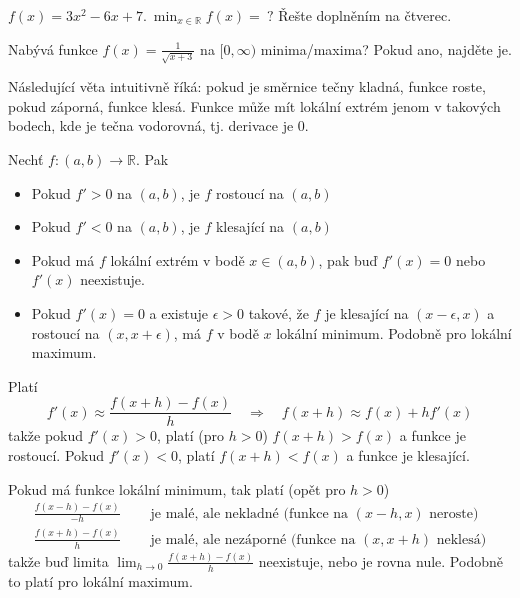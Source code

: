 \begin{úloha}\label{pr:minimum kvadraticke funkce}
	$f(x)=3x^{2}-6x+7.\ \min_{x\in \mathbb{R}}f(x)=\ ?$ Řešte doplněním na čtverec.
\end{úloha}

\begin{úloha}
	Nabývá funkce $f(x)=\frac{1}{\sqrt{x+3}}$ na $[0,\infty)$ minima/maxima? Pokud ano, najděte je.
\end{úloha}

Následující věta intuitivně říká: pokud je směrnice tečny kladná, funkce roste, pokud záporná, funkce klesá. Funkce může mít lokální extrém jenom v takových bodech, kde je tečna vodorovná, tj. derivace je 0.
\begin{věta*}\label{veta:Vlastnosti funkce plynoucí z derivace}
  Nechť $f\colon (a,b)\to \mathbb{R}$. Pak
  \begin{itemize}
	  \item Pokud $f'>0$ na $(a,b)$, je $f$ rostoucí na $(a,b)$
	  \item Pokud $f'<0$ na $(a,b)$, je $f$ klesající na $(a,b)$
	  \item Pokud má $f$ lokální extrém v bodě $x\in (a,b)$, pak buď $f'(x)=0$ nebo $f'(x)$ neexistuje.
	  \item Pokud $f'(x)=0$ a existuje $\epsilon>0$ takové, že $f$ je klesající na $(x-\epsilon,x)$ a rostoucí na $(x,x+\epsilon)$, má $f$ v bodě $x$ lokální minimum. Podobně pro lokální maximum.
  \end{itemize}
\end{věta*}
\begin{náčrt důkazu}
  Platí
  \begin{equation*}
    f'(x)\approx \frac{f(x+h)-f(x)}{h}\quad \Rightarrow \quad f(x+h)\approx f(x)+hf'(x)
  \end{equation*}
  takže pokud $f'(x)>0$, platí (pro $h>0$) $f(x+h)>f(x)$ a funkce je rostoucí. Pokud $f'(x)<0$, platí $f(x+h)<f(x)$ a funkce je klesající. 

  Pokud má funkce lokální minimum, tak platí (opět pro $h>0$)
  \begin{align*}
	  \frac{f(x-h)-f(x)}{-h} \quad &\text{ je malé, ale nekladné (funkce na $(x-h,x)$ neroste)} \\
	  \frac{f(x+h)-f(x)}{h} \quad  &\text{ je malé, ale nezáporné (funkce na $(x,x+h)$ neklesá)}
  \end{align*}
  takže buď limita $\lim_{h\to 0}\frac{f(x+h)-f(x)}{h}$ neexistuje, nebo je rovna nule. Podobně to platí pro lokální maximum.
\end{náčrt důkazu}

